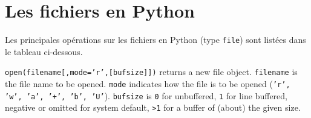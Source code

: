 \section{Les fichiers en {\sc Python}}\label{python:fichiers}
Les principales opérations sur les fichiers en {\sc Python} (type {\tt file}) 
sont listées dans le tableau ci-dessous.

{\tt open(filename[,mode='r',[bufsize]])} returns a new file object. 
{\tt filename} is the file name to be opened.
{\tt mode} indicates how the file is to be opened ({\tt 'r', 'w', 'a', '+', 'b', 'U'}).
{\tt bufsize} is {\tt 0} for unbuffered, {\tt 1} for line buffered, 
negative or omitted for system default, {\tt >1} for a buffer of (about) the given size.

